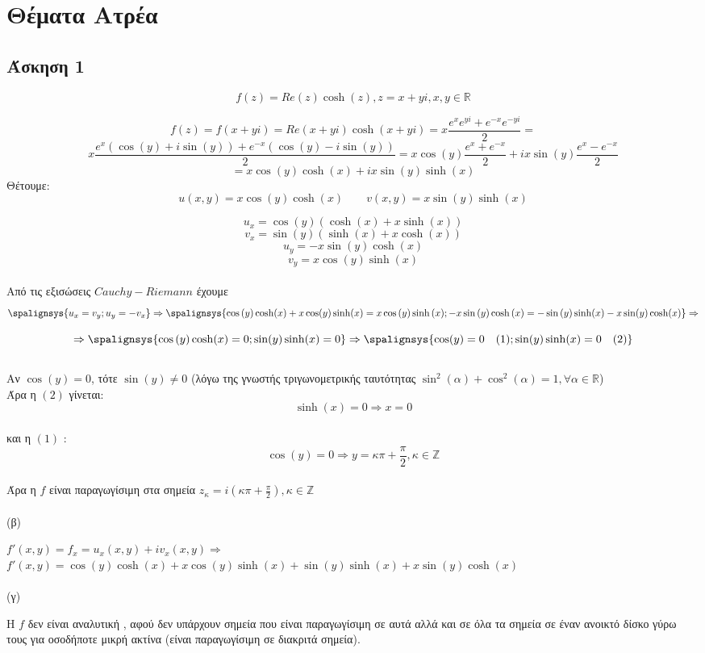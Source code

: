 \documentclass[12pt]{article}
\begin{document}
 \section{Θέματα Ατρέα}
 \subsection{Άσκηση 1}
$$f(z)=Re(z){\cosh(z)} ,z=x+yi , x,y\in\mathbb{R}$$

$$f(z)=f(x+yi)=Re(x+yi){\cosh(x+yi)}=
x\frac{e^{x}e^{yi}+e^{-x}e^{-yi}}{2}= $$
$$ x\frac{e^{x}({\cos(y)}+i{\sin(y)})+
e^{-x}({\cos(y)}-i{\sin(y)})}{2}
=x\cos(y)\frac{e^x+e^{-x}}{2}+
ix\sin(y)\frac{e^x-e^{-x}}{2}$$
$$
=x\cos{(y)}\cosh{(x)}+
ix\sin{(y)}\sinh{(x)}
$$
Θέτουμε:
$$u(x,y)=x\cos{(y)}\cosh{(x)}
\qquad
v(x,y)=x\sin{(y)}\sinh{(x)}
$$

$$u_x=\cos{(y)}(\cosh(x)+x\sinh(x))
$$
$$v_x=\sin{(y)}(\sinh(x)+x\cosh(x))
$$
$$u_y=-x\sin{(y)}\cosh{(x)}
$$
$$v_y=x\cos{(y)}\sinh{(x)}
$$
\\
Από τις εξισώσεις $Cauchy-Riemann$ έχουμε
\\
\[
\spalignsys {u_x=v_y;u_y=-v_x} \Rightarrow    
\spalignsys 
{\cos{(y)}\cosh(x)+x\cos(y)\sinh(x)=x\cos{(y)}\sinh{(x)};
-x\sin{(y)}\cosh{(x)}=-\sin{(y)}\sinh(x)-x\sin(y)\cosh(x)
}
\Rightarrow
\]

\[
\Rightarrow
\spalignsys{\cos{(y)}\cosh(x)=0;
\raggedright {\sin(y)\sinh(x)=0 } }
\Rightarrow
\spalignsys{\cos(y)=0 \quad (1) ;
\raggedright {\sin(y)\sinh(x)=0 \quad (2) } }
\]
\\
Αν $\cos(y)=0$, τότε $ \sin(y)\not= 0$ (λόγω της γνωστής τριγωνομετρικής ταυτότητας $\sin^2(\alpha)+\cos^2(\alpha)=1,\forall\alpha\in\mathbb{R}$)\\
Άρα η $(2)$ γίνεται: $$ \sinh(x)=0 \Rightarrow x=0$$ 
\\
και η $ (1) $ :  $$\cos(y)=0 \Rightarrow y=\kappa \pi + \frac{\pi}{2} , \kappa\in\mathbb{Z}$$
\\
Άρα η $f$ είναι παραγωγίσιμη στα σημεία $z_\kappa= i\left(\kappa \pi + \frac{\pi}{2} \right), \kappa\in\mathbb{Z} $
\\ \\
(β)

$f'(x,y)=f_x=u_x(x,y)+iv_x(x,y)\Rightarrow$\\
$f'(x,y)=\cos{(y)}\cosh(x)+x\cos(y)\sinh(x)+\sin{(y)}\sinh(x)+x\sin(y)\cosh(x)$
\\ \\
(γ)

Η $f$ δεν είναι αναλυτική , αφού δεν υπάρχουν σημεία που είναι παραγωγίσιμη σε αυτά αλλά και σε όλα τα σημεία σε έναν ανοικτό δίσκο γύρω τους για οσοδήποτε
μικρή ακτίνα (είναι παραγωγίσιμη σε διακριτά σημεία).
\end{document}
